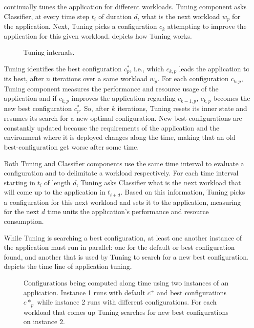 \name continually tunes the application for different workloads. Tuning
component asks Classifier, at every time step $t_i$ of duration $d$, what is the
next workload $w_p$ for the application. Next, Tuning picks a configuration
$c_k$ attempting to improve the application for this given workload.
 depicts how Tuning works.

\begin{figure*}[htp]
  \centering
  \def\svcwidth{\textwidth}
  \scalebox{1.0}{}
  \caption{Tuning internals.}
  \label{fig:tuning-internals}
\end{figure*}

Tuning identifies the best configuration $c^*_p$, i.e., which $c_{k,p}$ leads
the application to its best, after $n$ iterations over a same workload $w_p$.
For each configuration $c_{k,p}$, Tuning component measures the performance and
resource usage of the application and if $c_{k,p}$ improves the application
regarding $c_{k-1, p}$, $c_{k,p}$ becomes the new best configuration $c^*_p$.
So, after $k$ iterations, Tuning resets its inner state and resumes its search
for a new optimal configuration. New best-configurations are constantly updated
because the requirements of the application and the environment where it is
deployed changes along the time, making that an old best-configuration get worse
after some time.

Both Tuning and Classifier components use the same time interval to evaluate a
configuration and to delimitate a workload respectively. For each time interval
starting in $t_i$ of length $d$, Tuning asks Classifier what is the next
workload that will come up to the application in $t_{i+d}$. Based on this
information, Tuning picks a configuration for this next workload and sets it to
the application, measuring for the next $d$ time units the application's
performance and resource consumption.

While Tuning is searching a best configuration, at least one another instance of
the application must run in parallel: one for the default or best configuration
found, and another that is used by Tuning to search for a new best
configuration.  depicts the time line of
application tuning.

\begin{figure*}[htp]
  \centering
  \def\svcwidth{\textwidth}
  \scalebox{1.0}{}
  \caption{Configurations being computed along time using two instances of an
  application. Instance 1 runs with default $c^+$ and best configurations $c*_p$
  while instance 2 runs with different configurations. For each workload that
  comes up Tuning searches for new best configurations on instance 2.}
  \label{fig:computing-configurations}
\end{figure*}

